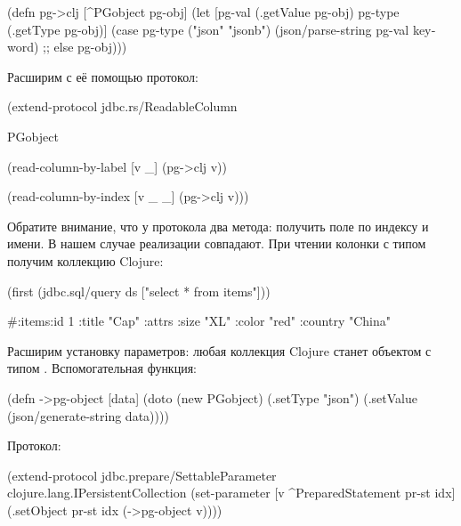 \begin{english}
  \begin{clojure}
(defn pg->clj
  [^PGobject pg-obj]
  (let [pg-val (.getValue pg-obj)
        pg-type (.getType pg-obj)]
    (case pg-type
      ("json" "jsonb")
      (json/parse-string pg-val keyword)
      ;; else
      pg-obj)))
  \end{clojure}
\end{english}

Расширим с её помощью протокол:

\begin{english}
  \begin{clojure}
(extend-protocol jdbc.rs/ReadableColumn

  PGobject

  (read-column-by-label [v _]
    (pg->clj v))

  (read-column-by-index [v _ _]
    (pg->clj v)))
  \end{clojure}
\end{english}

Обратите внимание, что у протокола два метода: получить поле по индексу и имени. В нашем случае реализации совпадают. При чтении колонки с типом  получим коллекцию Clojure:

\begin{english}
  \begin{clojure}
(first (jdbc.sql/query ds ["select * from items"]))

#:items{:id 1
        :title "Cap"
        :attrs {:size "XL"
                :color "red"
                :country "China"}}
  \end{clojure}
\end{english}

Расширим установку параметров: любая коллекция Clojure станет объектом  с типом . Вспомогательная функция:

\begin{english}
  \begin{clojure}
(defn ->pg-object [data]
  (doto (new PGobject)
    (.setType "json")
    (.setValue (json/generate-string data))))
  \end{clojure}
\end{english}

Протокол:

\begin{english}
  \begin{clojure}
(extend-protocol jdbc.prepare/SettableParameter
  clojure.lang.IPersistentCollection
  (set-parameter [v ^PreparedStatement pr-st idx]
    (.setObject pr-st idx (->pg-object v))))
  \end{clojure}
\end{english}

